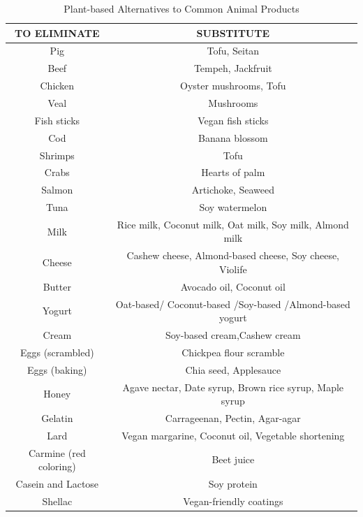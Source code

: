 \begin{table}[H]
\centering
\scriptsize
\begin{tabular}{|c|c|}
\hline
\textbf{TO ELIMINATE} & \textbf{SUBSTITUTE} \\ \hline
\rowcolor{purple!10} %
Pig & Tofu, Seitan\\ \hline
\rowcolor{purple!10}
Beef & Tempeh, Jackfruit\\ \hline
\rowcolor{purple!10}
Chicken & Oyster mushrooms, Tofu \\ \hline
\rowcolor{purple!10}
Veal & Mushrooms \\ \hline
\rowcolor{purple!10}
Fish sticks & Vegan fish sticks \\ \hline
\rowcolor{purple!10}
Cod & Banana blossom \\ \hline
\rowcolor{purple!10}
Shrimps & Tofu \\ \hline
\rowcolor{purple!10}
Crabs & Hearts of palm \\ \hline
\rowcolor{purple!10}
Salmon & Artichoke, Seaweed \\ \hline
\rowcolor{purple!10}
Tuna & Soy watermelon \\ \hline
Milk                   & Rice milk, Coconut milk, Oat milk, Soy milk, Almond milk  \\ \hline

Cheese                 & Cashew cheese, Almond-based cheese, Soy cheese, Violife    \\ \hline
Butter                 & Avocado oil, Coconut oil                      \\ \hline
Yogurt                 & Oat-based/ Coconut-based /Soy-based /Almond-based yogurt    \\ \hline
Cream                  & Soy-based cream,Cashew cream                  \\ \hline
Eggs (scrambled)       & Chickpea flour scramble          \\ \hline
Eggs (baking)          & Chia seed, Applesauce             \\ \hline
Honey                  & Agave nectar, Date syrup, Brown rice syrup, Maple syrup   \\ \hline
Gelatin                & Carrageenan, Pectin, Agar-agar                      \\ \hline
Lard                   & Vegan margarine, Coconut oil, Vegetable shortening   \\ \hline
Carmine (red coloring) & Beet juice                       \\ \hline
Casein and Lactose     & Soy protein                      \\ \hline
Shellac                & Vegan-friendly coatings          \\ \hline

\end{tabular}
\caption{Plant-based Alternatives to Common Animal Products}
\label{tab:vegansub}
\end{table}

